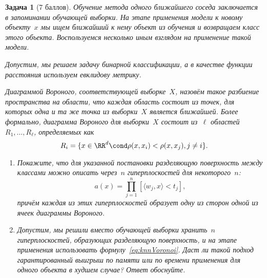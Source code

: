 \documentclass[12pt,fleqn]{article}
\newtheorem{esProblem}{Задача}
\begin{document}
\begin{esProblem}[7 баллов]
    Обучение метода одного ближайшего соседа заключается в запоминании обучающей выборки.
    На этапе применения модели к новому объекту~$x$ мы ищем ближайший к нему объект из обучения
    и возвращаем класс этого объекта.
    Воспользуемся несколько иным взглядом на применение такой модели.

    Допустим, мы решаем задачу бинарной классификации, а в качестве функции расстояния используем
    евклидову метрику.

    Диаграммой Вороного, соответствующей выборке~$X$, назовём такое разбиение пространства
    на области, что каждая область состоит из точек, для которых одна и та же точка из выборки~$X$ является ближайшей.
    Более формально, диаграмма Вороного для выборки~$X$ состоит из~$\ell$ областей~$R_1, \dots, R_\ell$,
    определяемых как
    \[
        R_i = \{x \in \RR^d \cond \rho(x, x_i) < \rho(x, x_j), j \neq i\}.
    \]

    \begin{enumerate}
        \item Покажите, что для указанной постановки разделяющую поверхность между классами
            можно описать через~$n$ гиперплоскостей для некоторого~$n$:
            \begin{equation}
            \label{eq:knnVoronoi}
                a(x)
                =
                \prod_{j = 1}^{n}
                    [\langle w_j, x \rangle < t_j],
            \end{equation}
            причём каждая из этих гиперплоскостей образует одну из сторон
            одной из ячеек диаграммы Вороного.
        \item Допустим, мы решили вместо обучающей выборки хранить~$n$ гиперплоскостей, образующих разделяющую поверхность,
            и на этапе применения использовать формулу~\eqref{eq:knnVoronoi}.
            Даст ли такой подход гарантированный выигрыш по памяти или по времени применения для одного объекта
            в худшем случае?
            Ответ обоснуйте.
    \end{enumerate}
\end{esProblem}
\end{document}
